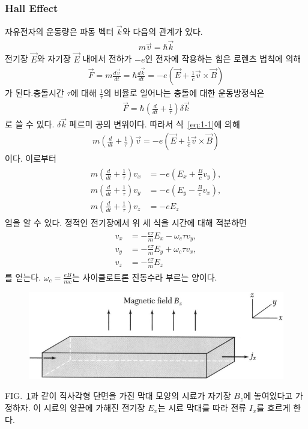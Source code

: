 \documentclass[aps,reprint,superscriptaddress,10pt]{revtex4-2}
\begin{document}
\subsubsection{Hall Effect}
자유전자의 운동량은 파동 벡터 $\vec{k}$와 다음의 관계가 있다.
\begin{align}\label{eq:1-1}
  m\vec{v} = \hbar \vec{k}
\end{align}
전기장 $\vec{E}$와 자기장 $\vec{E}$ 내에서 전하가 $-e$인 전자에 작용하는 힘은 로렌츠 법칙에
의해
\begin{align}\label{eq:1-2}
  \vec{F} = m\frac{d\vec{v}}{dt} = \hbar\frac{d\vec{k}}{dt}
  =-e\left(\vec{E}+\frac{1}{c}\vec{v} \times \vec{B}\right)
\end{align}
가 된다.충돌시간 $\tau$에 대해 $\frac{1}{\tau}$의 비율로 일어나는 충돌에 대한 운동방정식은
\begin{align}\label{eq:1-3}
  \vec{F} = \hbar\left(\frac{d}{dt}+\frac{1}{\tau}\right)\delta\vec{k}
\end{align}
로 쓸 수 있다. $\delta\vec{k}$ 페르미 공의 변위이다. 따라서 식~\eqref{eq:1-1}에 의해
\begin{align}
  m\left(\frac{d}{dt}+\frac{1}{\tau}\right)\vec{v}
  =-e\left(\vec{E}+\frac{1}{c}\vec{v} \times \vec{B}\right)
\end{align}
이다. 이로부터
\begin{align}
  \begin{split}
    m\left(\frac{d}{dt}+\frac{1}{\tau}\right)v_x &= -e\left(E_x+\frac{B}{c}v_y\right), \\
    m\left(\frac{d}{dt}+\frac{1}{\tau}\right)v_y &= -e\left(E_y-\frac{B}{c}v_x\right), \\
    m\left(\frac{d}{dt}+\frac{1}{\tau}\right)v_z &= -eE_z
  \end{split}
\end{align}
임을 알 수 있다. 정적인 전기장에서 위 세 식을 시간에 대해 적분하면
\begin{align}
  \begin{split}\label{eq:1-4}
    v_x &= -\frac{e\tau}{m}E_x-\omega_c \tau v_y,  \\
    v_y &= -\frac{e\tau}{m}E_y+\omega_c \tau v_x,  \\
    v_z &= -\frac{e\tau}{m}E_z
  \end{split}
\end{align}
를 얻는다. $\omega_c=\frac{eB}{mc}$는 사이클로트론 진동수라 부르는 양이다.

\begin{figure}[htbp]
  \centering
  \includegraphics[scale = 0.35]{1-1.png}
  \caption{}
  \label{fig:1-1}
\end{figure}
FIG.~\ref{fig:1-1}과 같이 직사각형 단면을 가진 막대 모양의 시료가 자기장 $B_z$에 놓여있다고
가정하자. 이 시료의 양끝에 가해진 전기장 $E_x$는 시료 막대를 따라 전류 $I_x$를 흐르게 한다.
\end{document}
